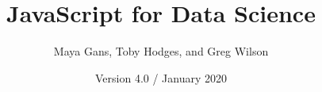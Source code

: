 \documentclass[nemilov1]{Nemilov}
\begin{document}
\title{JavaScript for Data Science}
\author{Maya Gans, Toby Hodges, and Greg Wilson}
\date{Version 4.0 / January 2020}
\maketitle

\frontmatter

\tableofcontents

\mainmatter

















\cleardoublepage

\printbibliography

\appendix














\printindex
\end{document}
